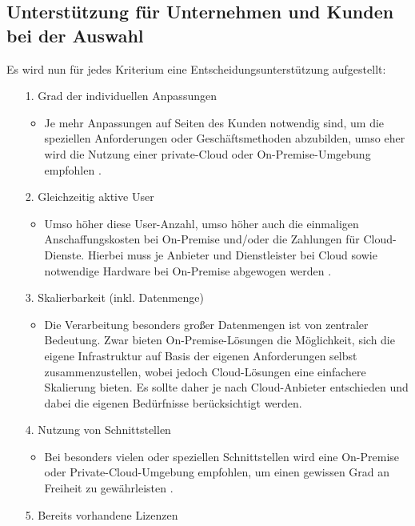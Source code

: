 \documentclass[12pt,bibtotoc]{article}
\begin{document}
		\subsection{Unterstützung für Unternehmen und Kunden bei der Auswahl}
		Es wird nun für jedes Kriterium eine Entscheidungsunterstützung aufgestellt:
		\begin{itemize}
			\item[1.] Grad der individuellen Anpassungen
			\begin{itemize}
				\item Je mehr Anpassungen auf Seiten des Kunden notwendig sind, um die speziellen Anforderungen oder Geschäftsmethoden abzubilden, umso eher wird die Nutzung einer private-Cloud oder On-Premise-Umgebung empfohlen \cite{Anhang}.
			\end{itemize}
			\item[2.] Gleichzeitig aktive User
				\begin{itemize}
					\item  Umso höher diese User-Anzahl, umso höher auch die einmaligen Anschaffungskosten bei On-Premise und/oder die Zahlungen für Cloud-Dienste. Hierbei muss je Anbieter und Dienstleister bei Cloud sowie notwendige Hardware bei On-Premise abgewogen werden \cite{Murugesan.2016}.
				\end{itemize}
			\item[3.] Skalierbarkeit (inkl. Datenmenge)
				\begin{itemize}
					\item Die Verarbeitung besonders großer Datenmengen ist von zentraler Bedeutung. Zwar bieten On-Premise-Lösungen die Möglichkeit, sich die eigene Infrastruktur auf Basis der eigenen Anforderungen selbst zusammenzustellen, wobei jedoch Cloud-Lösungen eine einfachere Skalierung bieten. Es sollte daher je nach Cloud-Anbieter entschieden und dabei die eigenen Bedürfnisse berücksichtigt werden.
				\end{itemize}
			\item[4.] Nutzung von Schnittstellen
				\begin{itemize}
					\item Bei besonders vielen oder speziellen Schnittstellen wird eine On-Premise oder Private-Cloud-Umgebung empfohlen, um einen gewissen Grad an Freiheit zu gewährleisten \cite{Anhang}.
				\end{itemize}
			\item[5.] Bereits vorhandene Lizenzen

\end{itemize}
\end{document}
